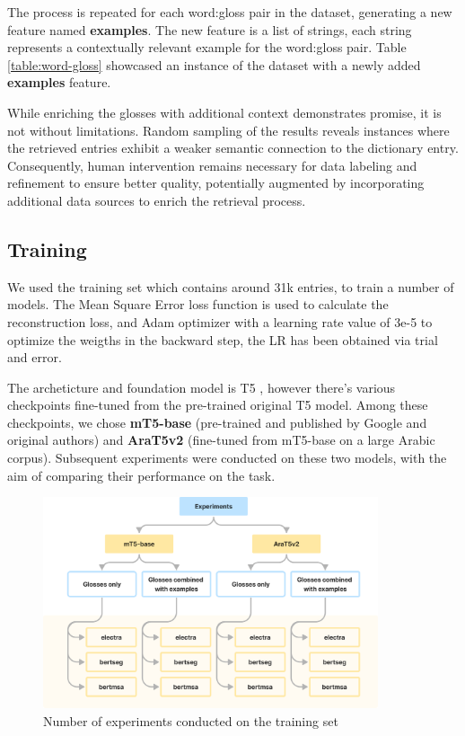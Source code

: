 \documentclass[12pt]{article}
\begin{document}
The process is repeated for each word:gloss pair in the dataset, generating a new feature named \textbf{examples}. The new feature is a list of strings, each string represents a contextually relevant example for the word:gloss pair. Table \ref{table:word-gloss} showcased an instance of the dataset with a newly added \textbf{examples} feature.

While enriching the glosses with additional context demonstrates promise, it is not without limitations. Random sampling of the results reveals instances where the retrieved entries exhibit a weaker semantic connection to the dictionary entry. Consequently, human intervention remains necessary for data labeling and refinement to ensure better quality, potentially augmented by incorporating additional data sources to enrich the retrieval process.

\subsection{Training}

We used the training set which contains around 31k entries, to train a number of models. The Mean Square Error loss function is used to calculate the reconstruction loss, and Adam optimizer with a learning rate value of 3e-5 to optimize the weigths in the backward step, the LR has been obtained via trial and error. 

The archeticture and foundation model is T5 \cite{Linting2021}, however there's various checkpoints fine-tuned from the pre-trained original T5 model. Among these checkpoints, we chose \textbf{mT5-base} (pre-trained and published by Google and original authors) and \textbf{AraT5v2} \cite{Nagoudi2021} (fine-tuned from mT5-base on a large Arabic corpus). Subsequent experiments were conducted on these two models, with the aim of comparing their performance on the task.

\begin{figure}[t!]
    \centering
    \captionsetup{justification=centering}
    \includegraphics[width=0.88\textwidth]{experiments-chart.png}
    \caption{Number of experiments conducted on the training set}
    \label{fig:experiments}
\end{figure}
\end{document}
